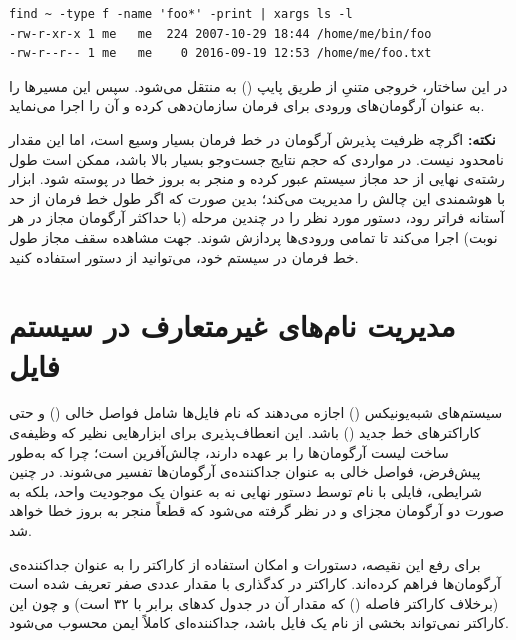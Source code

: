 \begin{latin}
\begin{lstlisting}
find ~ -type f -name 'foo*' -print | xargs ls -l
-rw-r-xr-x 1 me   me  224 2007-10-29 18:44 /home/me/bin/foo
-rw-r--r-- 1 me   me    0 2016-09-19 12:53 /home/me/foo.txt
\end{lstlisting}
\end{latin}

در این ساختار، خروجی متنیِ  از طریق پایپ () به  منتقل می‌شود. سپس  این مسیرها را به عنوان آرگومان‌های ورودی برای فرمان  سازمان‌دهی کرده و آن را اجرا می‌نماید.

\begin{note}
\textbf{نکته:} اگرچه ظرفیت پذیرش آرگومان در خط فرمان بسیار وسیع است، اما این مقدار نامحدود نیست. در مواردی که حجم نتایج جست‌وجو بسیار بالا باشد، ممکن است طول رشته‌ی نهایی از حد مجاز سیستم عبور کرده و منجر به بروز خطا در پوسته شود. ابزار  با هوشمندی این چالش را مدیریت می‌کند؛ بدین صورت که اگر طول خط فرمان از حد آستانه فراتر رود، دستور مورد نظر را در چندین مرحله (با حداکثر آرگومان مجاز در هر نوبت) اجرا می‌کند تا تمامی ورودی‌ها پردازش شوند. جهت مشاهده سقف مجاز طول خط فرمان در سیستم خود، می‌توانید از دستور  استفاده کنید.
\end{note}

\section{مدیریت نام‌های غیرمتعارف در سیستم فایل}

سیستم‌های شبه‌یونیکس () اجازه می‌دهند که نام فایل‌ها شامل فواصل خالی () و حتی کاراکترهای خط جدید () باشد. این انعطاف‌پذیری برای ابزارهایی نظیر  که وظیفه‌ی ساخت لیست آرگومان‌ها را بر عهده دارند، چالش‌آفرین است؛ چرا که به‌طور پیش‌فرض، فواصل خالی به عنوان جداکننده‌ی آرگومان‌ها تفسیر می‌شوند. در چنین شرایطی، فایلی با نام  توسط دستور نهایی نه به عنوان یک موجودیت واحد، بلکه به صورت دو آرگومان مجزای  و  در نظر گرفته می‌شود که قطعاً منجر به بروز خطا خواهد شد.

برای رفع این نقیصه، دستورات  و  امکان استفاده از کاراکتر  را به عنوان جداکننده‌ی آرگومان‌ها فراهم کرده‌اند. کاراکتر  در کدگذاری  با مقدار عددی صفر تعریف شده است (برخلاف کاراکتر فاصله () که مقدار آن در جدول کدهای  برابر با ۳۲ است) و چون این کاراکتر نمی‌تواند بخشی از نام یک فایل باشد، جداکننده‌ای کاملاً ایمن محسوب می‌شود.

